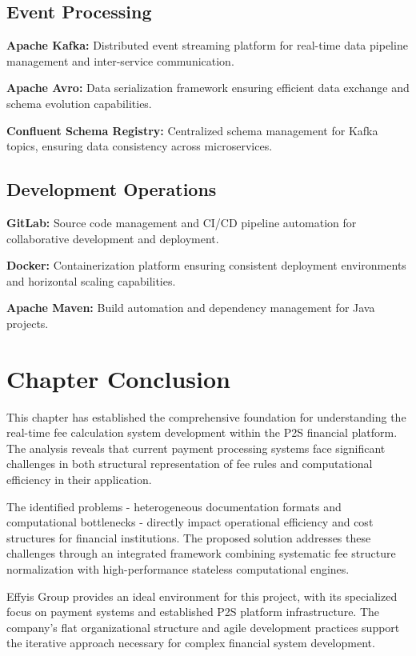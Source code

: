 \subsection{Event Processing}

\textbf{Apache Kafka:} Distributed event streaming platform for real-time data pipeline management and inter-service communication.

\textbf{Apache Avro:} Data serialization framework ensuring efficient data exchange and schema evolution capabilities.

\textbf{Confluent Schema Registry:} Centralized schema management for Kafka topics, ensuring data consistency across microservices.

\subsection{Development Operations}

\textbf{GitLab:} Source code management and CI/CD pipeline automation for collaborative development and deployment.

\textbf{Docker:} Containerization platform ensuring consistent deployment environments and horizontal scaling capabilities.

\textbf{Apache Maven:} Build automation and dependency management for Java projects.

\section{Chapter Conclusion}

This chapter has established the comprehensive foundation for understanding the real-time fee calculation system development within the P2S financial platform. The analysis reveals that current payment processing systems face significant challenges in both structural representation of fee rules and computational efficiency in their application.

The identified problems - heterogeneous documentation formats and computational bottlenecks - directly impact operational efficiency and cost structures for financial institutions. The proposed solution addresses these challenges through an integrated framework combining systematic fee structure normalization with high-performance stateless computational engines.

Effyis Group provides an ideal environment for this project, with its specialized focus on payment systems and established P2S platform infrastructure. The company's flat organizational structure and agile development practices support the iterative approach necessary for complex financial system development.

